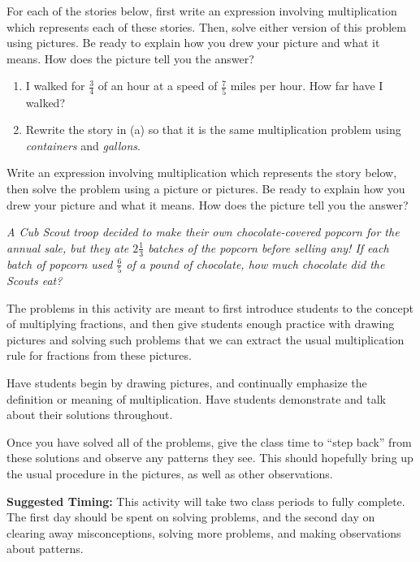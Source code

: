 \documentclass{ximera}
\begin{document}
\begin{problem}
 For each of the stories below, first write an expression involving multiplication which represents each of these stories.  Then, solve either version of this problem using pictures.  Be ready to explain how you drew your picture and what it means.  How does the picture tell you the answer? 

\begin{enumerate}
    \item I walked for  $\frac{3}{4}$ of an hour at a speed of  $\frac{7}{5}$ miles per hour.  How far have I walked?
    \item Rewrite the story in (a) so that it is the same multiplication problem using \emph{containers} and \emph{gallons}.
\end{enumerate}
\end{problem}
\vfill

\begin{problem}
 Write an expression involving multiplication which represents the story below, then solve the problem using a picture or pictures.  Be ready to explain how you drew your picture and what it means.  How does the picture tell you the answer?


\emph{A Cub Scout troop decided to make their own chocolate-covered popcorn for the annual sale, but they ate $2 \frac{1}{3}$ batches of the popcorn before selling any! If each batch of popcorn used $\frac{6}{5}$ of a pound of chocolate, how much chocolate did the Scouts eat?}

\end{problem}
\vfill
 
\newpage
\begin{instructorNotes}
The problems in this activity are meant to first introduce students to the concept of multiplying fractions, and then give students enough practice with drawing pictures and solving such problems that we can extract the usual multiplication rule for fractions from these pictures.  

Have students begin by drawing pictures, and continually emphasize the definition or meaning of multiplication.  Have students demonstrate and talk about their solutions throughout.  

Once you have solved all of the problems, give the class time to ``step back'' from these solutions and observe any patterns they see.  This should hopefully bring up the usual procedure in the pictures, as well as other observations.

{\bf Suggested Timing:} This activity will take two class periods to fully complete.  The first day should be spent on solving problems, and the second day on clearing away misconceptions, solving more problems, and making observations about patterns.
\end{instructorNotes}
\end{document}
